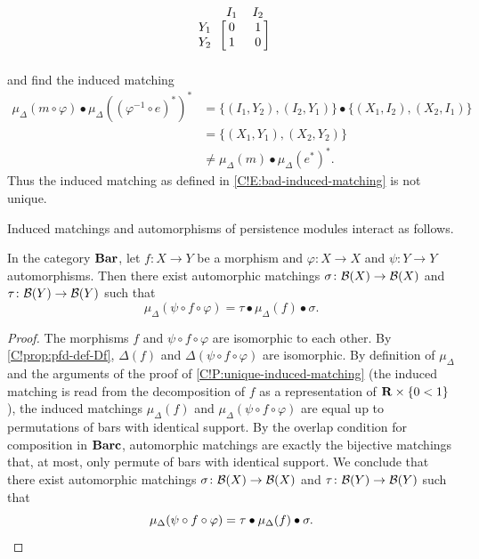 \begin{example}
\[\begin{blockarray}{c cc}
      & I_1 & I_2 \\
      \begin{block}{c [cc]}
        Y_1 & 0 & 1 \\
        Y_2 & 1 & 0 \\
      \end{block}
    \end{blockarray}
  \]
  and find the induced matching
  \begin{align*}
    \mu_\Delta(m \circ \varphi) \bullet \mu_\Delta((\varphi^{-1} \circ e)^*)^*
    & = \{(I_1, Y_2), (I_2, Y_1)\} \bullet \{(X_1, I_2), (X_2, I_1)\} \\
    & = \{(X_1, Y_1), (X_2, Y_2)\} \\
    & \neq \mu_\Delta(m) \bullet \mu_\Delta(e^*)^*.
  \end{align*}
  Thus the induced matching as defined in \cref{C!E:bad-induced-matching} is not unique.
\end{example}

Induced matchings and automorphisms of persistence modules interact as follows.

\begin{proposition}
\label{C!P:up-to-perm}
  In the category $\Bar$, let $f \colon X \to Y$ be a morphism and $\varphi \colon X \to X$ and $\psi \colon Y \to Y$ automorphisms. Then there exist automorphic matchings $\sigma \colon \cc{B}(X) \to \cc{B}(X)$ and $\tau \colon \cc{B}(Y) \to \cc{B}(Y)$ such that
  \[
    \mu_\Delta(\psi \circ f \circ \varphi) = \tau \bullet \mu_\Delta(f) \bullet \sigma.
  \]
\end{proposition}

\begin{proof}
  The morphisms $f$ and $\psi \circ f \circ \varphi$ are isomorphic to each other. By \cref{C!prop:pfd-def-Df}, $\Delta(f)$ and $\Delta(\psi \circ f \circ \varphi)$ are isomorphic. By definition of $\mu_\Delta$ and the arguments of the proof of \cref{C!P:unique-induced-matching} (the induced matching is read from the decomposition of $f$ as a representation of $\R \times \{0 < 1\}$), the induced matchings $\mu_\Delta(f)$ and $\mu_\Delta(\psi \circ f \circ \varphi)$ are equal up to permutations of bars with identical support. By the overlap condition for composition in $\Barc$, automorphic matchings are exactly the bijective matchings that, at most, only permute of bars with identical support. We conclude that there exist automorphic matchings $\sigma \colon \cc{B}(X) \to \cc{B}(X)$ and $\tau \colon \cc{B}(Y) \to \cc{B}(Y)$ such that
  \[
    \mu_\Delta(\psi \circ f \circ \varphi) = \tau \bullet \mu_\Delta(f) \bullet \sigma.
    \qedhere
  \]
\end{proof}


